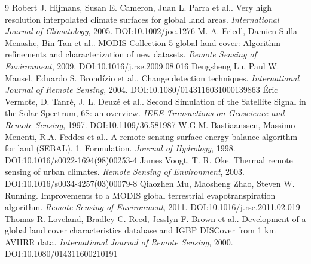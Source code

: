 \documentclass[11pt]{article}
\begin{document}
\begin{thebibliography}{9}
 Robert J. Hijmans, Susan E. Cameron, Juan L. Parra et al.. Very high resolution interpolated climate surfaces for global land areas. \emph{International Journal of Climatology}, 2005. DOI:10.1002/joc.1276
 M. A. Friedl, Damien Sulla‐Menashe, Bin Tan et al.. MODIS Collection 5 global land cover: Algorithm refinements and characterization of new datasets. \emph{Remote Sensing of Environment}, 2009. DOI:10.1016/j.rse.2009.08.016
 Dengsheng Lu, Paul W. Mausel, Eduardo S. Brondízio et al.. Change detection techniques. \emph{International Journal of Remote Sensing}, 2004. DOI:10.1080/0143116031000139863
 Éric Vermote, D. Tanré, J. L. Deuzé et al.. Second Simulation of the Satellite Signal in the Solar Spectrum, 6S: an overview. \emph{IEEE Transactions on Geoscience and Remote Sensing}, 1997. DOI:10.1109/36.581987
 W.G.M. Bastiaanssen, Massimo Menenti, R.A. Feddes et al.. A remote sensing surface energy balance algorithm for land (SEBAL). 1. Formulation. \emph{Journal of Hydrology}, 1998. DOI:10.1016/s0022-1694(98)00253-4
 James Voogt, T. R. Oke. Thermal remote sensing of urban climates. \emph{Remote Sensing of Environment}, 2003. DOI:10.1016/s0034-4257(03)00079-8
 Qiaozhen Mu, Maosheng Zhao, Steven W. Running. Improvements to a MODIS global terrestrial evapotranspiration algorithm. \emph{Remote Sensing of Environment}, 2011. DOI:10.1016/j.rse.2011.02.019
 Thomas R. Loveland, Bradley C. Reed, Jesslyn F. Brown et al.. Development of a global land cover characteristics database and IGBP DISCover from 1 km AVHRR data. \emph{International Journal of Remote Sensing}, 2000. DOI:10.1080/014311600210191
\end{thebibliography}
\end{document}
